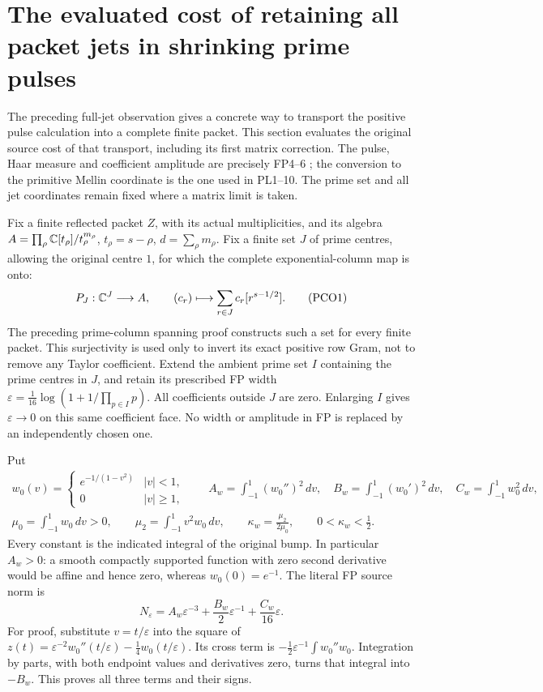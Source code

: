 \section{The evaluated cost of retaining all packet jets in shrinking prime pulses}
\label{sec:pulse-packet-cost}

The preceding full-jet observation gives a concrete way to
transport the positive pulse calculation into a complete finite
packet. This section evaluates the original source cost of that
transport, including its first matrix correction. The pulse,
Haar measure and coefficient amplitude are precisely FP4--6
\cite{FinitePrimePulse}; the conversion to the primitive Mellin
coordinate is the one used in PL1--10. The prime set and all
jet coordinates remain fixed where a matrix limit is taken.

Fix a finite reflected packet $Z$, with its actual multiplicities,
and its algebra $A=\prod_\rho\mathbb C[t_\rho]/t_\rho^{m_\rho}$,
$t_\rho=s-\rho$, $d=\sum_\rho m_\rho$. Fix a finite set $J$
of prime centres, allowing the original centre $1$, for which
the complete exponential-column map is onto:
\[
 P_J:\mathbb C^J\longrightarrow A,\qquad
 (c_r)\longmapsto\sum_{r\in J}c_r[r^{s-1/2}].
 \tag{PCO1}\label{pco:prime-columns}
\]
The preceding prime-column spanning proof constructs such a set
for every finite packet. This surjectivity is used only to
invert its exact positive row Gram, not to remove any Taylor
coefficient. Extend the ambient prime set $I$ containing the
prime centres in $J$, and retain its prescribed FP width
$\varepsilon=\frac1{16}\log(1+1/\prod_{p\in I}p)$.
All coefficients outside $J$ are zero. Enlarging $I$ gives
$\varepsilon\to0$ on this same coefficient face. No width or
amplitude in FP is replaced by an independently chosen one.

Put
\[
\begin{gathered}
 w_0(v)=\begin{cases}e^{-1/(1-v^2)}&|v|<1,\\0&|v|\ge1,
             \end{cases}\qquad
 A_w=\int_{-1}^1(w_0'')^2\,dv,\quad
 B_w=\int_{-1}^1(w_0')^2\,dv,\quad
 C_w=\int_{-1}^1w_0^2\,dv,\\
 \mu_0=\int_{-1}^1w_0\,dv>0,\qquad
 \mu_2=\int_{-1}^1v^2w_0\,dv,\qquad
 \kappa_w=\frac{\mu_2}{2\mu_0},\qquad 0<\kappa_w<\frac12.
\end{gathered}
 \tag{PCO2}\label{pco:constants}
\]
Every constant is the indicated integral of the original bump.
In particular $A_w>0$: a smooth compactly supported function
with zero second derivative would be affine and hence zero,
whereas $w_0(0)=e^{-1}$. The literal FP source norm is
\[
 N_\varepsilon
 =A_w\varepsilon^{-3}+\frac{B_w}{2}\varepsilon^{-1}
                         +\frac{C_w}{16}\varepsilon.
 \tag{PCO3}\label{pco:mass}
\]
For proof, substitute $v=t/\varepsilon$ into the square of
$z(t)=\varepsilon^{-2}w_0''(t/\varepsilon)
                  -\frac14w_0(t/\varepsilon)$.
Its cross term is $-\frac12\varepsilon^{-1}\int w_0''w_0$.
Integration by parts, with both endpoint values and derivatives
zero, turns that integral into $-B_w$. This proves all three
terms and their signs.

